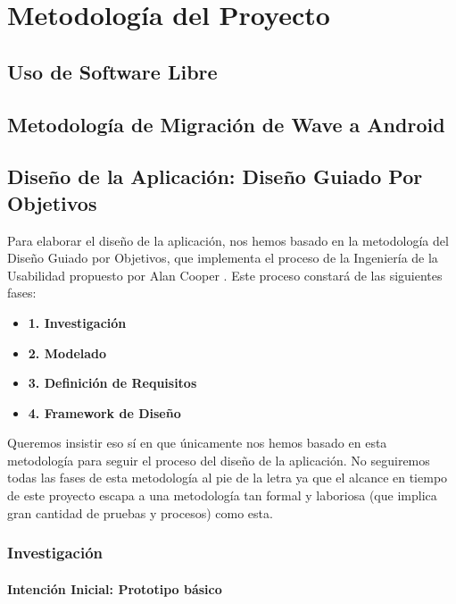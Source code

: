 \newpage
\thispagestyle{sectioned}
\chapter{Metodología del Proyecto}

\section{Uso de Software Libre}

\section{Metodología de Migración de Wave a Android}

\section{Diseño de la Aplicación: Diseño Guiado Por Objetivos}

Para elaborar el diseño de la aplicación, nos hemos basado en la metodología del Diseño Guiado por Objetivos, que implementa el proceso de la Ingeniería de la Usabilidad propuesto por Alan Cooper \cite{ref:bookAlanCooper}. Este proceso constará de las siguientes fases:

\begin{itemize}
	\item \textbf{1. Investigación}
	\item \textbf{2. Modelado}
	\item \textbf{3. Definición de Requisitos}
	\item \textbf{4. Framework de Diseño}
\end{itemize}

Queremos insistir eso sí en que únicamente nos hemos basado en esta metodología para seguir el proceso del diseño de la aplicación. No seguiremos todas las fases de esta metodología al pie de la letra ya que el alcance en tiempo de este proyecto escapa a una metodología tan formal y laboriosa (que implica gran cantidad de pruebas y procesos) como esta.

\subsection{Investigación}

\subsubsection{Intención Inicial: Prototipo básico}  

